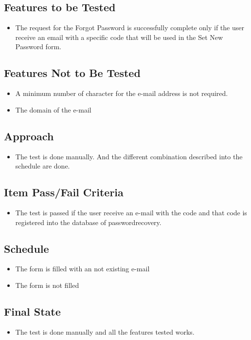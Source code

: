 \documentclass{article}
\begin{document}
\subsection{Features to be Tested}
\begin{itemize}
    \item The request for the Forgot Password is successfully complete only if the user receive an email with a specific code that will be used in the Set New Password form.
\end{itemize}
\subsection{Features Not to Be Tested}
\begin{itemize}
    \item A minimum number of character for the e-mail address is not required.
    \item The domain of the e-mail 
\end{itemize}
\subsection{Approach}
\begin{itemize}
    \item The test is done manually. And the different combination described into the schedule are done. 
\end{itemize}
\subsection{Item Pass/Fail Criteria}
\begin{itemize}
    \item The test is passed if the user receive an e-mail with the code and that code is registered into the database of password\textunderscore recovery.
   \end{itemize}
\subsection{Schedule}
\begin{itemize}
    \item The form is filled with an not existing e-mail
    \item The form is not filled 
\end{itemize}
\subsection{Final State}
\begin{itemize}
    \item The test is done manually and all the features tested works.
\end{itemize}
\end{document}
